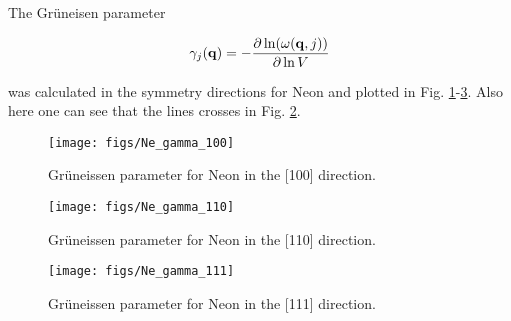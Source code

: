 The Gr\"{u}neisen parameter

\begin{equation}
  \label{eq:Gruneisen}
  \gamma_j(\mathbf{q}) = -\frac{\partial \ln (\omega (\mathbf{q},j))}{\partial \ln V}
\end{equation}

was calculated in the symmetry directions for Neon and plotted in Fig. \ref{fig:gamma100}-\ref{fig:gamma111}. Also here one can see that the lines crosses in Fig. \ref{fig:gamma110}.

\begin{figure}[H]
  \centering
  \texttt{[image: figs/Ne\_gamma\_100]}
  \caption{Gr\"{u}neissen parameter for Neon in the [100] direction.}
  \label{fig:gamma100}
\end{figure}
\begin{figure}[H]
  \centering
  \texttt{[image: figs/Ne\_gamma\_110]}
  \caption{Gr\"{u}neissen parameter for Neon in the [110] direction.}
  \label{fig:gamma110}
\end{figure}
\begin{figure}[H]
  \centering
  \texttt{[image: figs/Ne\_gamma\_111]}
  \caption{Gr\"{u}neissen parameter for Neon in the [111] direction.}
  \label{fig:gamma111}
\end{figure}
